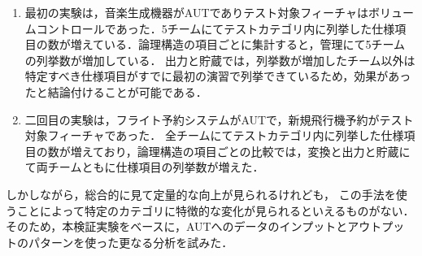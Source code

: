 \documentclass[a4paper,11pt]{jreport}
\begin{document}
\begin{enumerate}
\item 最初の実験は，音楽生成機器がAUTでありテスト対象フィーチャはボリュームコントロールであった．5チームにてテストカテゴリ内に列挙した仕様項目の数が増えている．論理構造の項目ごとに集計すると，管理にて5チームの列挙数が増加している． 出力と貯蔵では，列挙数が増加したチーム以外は特定すべき仕様項目がすでに最初の演習で列挙できているため，効果があったと結論付けることが可能である．
\item 二回目の実験は，フライト予約システムがAUTで，新規飛行機予約がテスト対象フィーチャであった． 全チームにてテストカテゴリ内に列挙した仕様項目の数が増えており，論理構造の項目ごとの比較では，変換と出力と貯蔵にて両チームともに仕様項目の列挙数が増えた．
\end{enumerate}

しかしながら，総合的に見て定量的な向上が見られるけれども， この手法を使うことによって特定のカテゴリに特徴的な変化が見られるといえるものがない．そのため，本検証実験をベースに，AUTへのデータのインプットとアウトプットのパターンを使った更なる分析を試みた．

\end{document}
